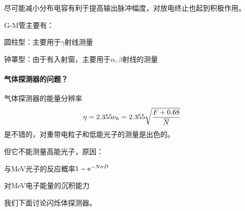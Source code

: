尽可能减小分布电容有利于提高输出脉冲幅度，对放电终止也起到积极作用。


G-M管主要有：
\begin{compactenum}
	\item 圆柱型：主要用于$\gamma$射线测量
	\item 钟罩型：由于有入射窗，主要用于$\alpha,\beta$射线的测量
\end{compactenum}
\newpage
\paragraph{气体探测器的问题？}气体探测器的能量分辨率
\[
	\eta=2.355\nu_h=2.355\sqrt{\frac{F+0.68}{\overline{N}}}
\]
是不错的，对重带电粒子和低能光子的测量是出色的。

但它不能测量高能光子，原因：
\begin{compactenum}
	\item 与MeV光子的反应概率$1-\mathop{}\!\mathrm{e}^{-N\sigma D}$
	\item 对MeV电子能量的沉积能力
\end{compactenum}
我们下面讨论闪烁体探测器。

